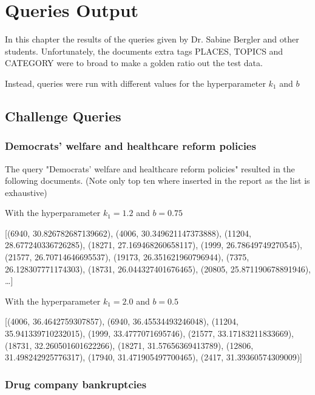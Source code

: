\chapter{Queries Output}

\par In this chapter the results of the queries given by Dr. Sabine Bergler and other students. Unfortunately, the documents extra tags PLACES, TOPICS and CATEGORY were to broad to make a golden ratio out the test data. 
\par Instead, queries were run with different values for the hyperparameter $k_1$ and $b$
\section{Challenge Queries}

\subsection{Democrats’ welfare and healthcare reform policies}

\par The query "Democrats’ welfare and healthcare reform policies" resulted in the following documents. (Note only top ten where inserted in the report as the list is exhaustive)

\par With the hyperparameter $k_1=1.2$ and $b=0.75$
\begin{center}
    [(6940, 30.826782687139662), (4006, 30.349621147373888), (11204, 28.677240336726285), (18271, 27.169468260658117), (1999, 26.78649749270545), (21577, 26.70714646695537), (19173, 26.351621960796944), (7375, 26.128307771174303), (18731, 26.044327401676465), (20805, 25.871190678891946), \dots]
\end{center}

\par With the hyperparameter $k_1=2.0$ and $b=0.5$
\begin{center}
    [(4006, 36.4642759307857), (6940, 36.45534493246048), (11204, 35.941339710232015), (1999, 33.4777071695746), (21577, 33.17183211833669), (18731, 32.260501601622266), (18271, 31.57656369413789), (12806, 31.498242925776317), (17940, 31.471905497700465), (2417, 31.39360574309009)]
\end{center}

\subsection{Drug company bankruptcies}


